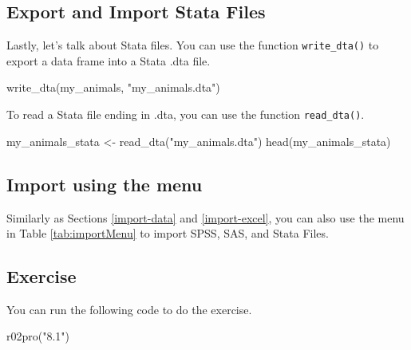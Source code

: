 \documentclass[
]{book}
\newenvironment{Shaded}{\begin{snugshade}}{\end{snugshade}}
\newcommand{\FunctionTok}[1]{\textcolor[rgb]{0.00,0.00,0.00}{#1}}
\newcommand{\NormalTok}[1]{#1}
\newcommand{\OtherTok}[1]{\textcolor[rgb]{0.56,0.35,0.01}{#1}}
\newcommand{\StringTok}[1]{\textcolor[rgb]{0.31,0.60,0.02}{#1}}
\begin{document}
\hypertarget{export-and-import-stata-files}{%
\subsection{Export and Import Stata Files}\label{export-and-import-stata-files}}

Lastly, let's talk about Stata files. You can use the function \texttt{write\_dta()} to export a data frame into a Stata .dta file.

\begin{Shaded}
\begin{Highlighting}[]
\FunctionTok{write\_dta}\NormalTok{(my\_animals, }\StringTok{"my\_animals.dta"}\NormalTok{)}
\end{Highlighting}
\end{Shaded}

To read a Stata file ending in .dta, you can use the function \texttt{read\_dta()}.

\begin{Shaded}
\begin{Highlighting}[]
\NormalTok{my\_animals\_stata }\OtherTok{\textless{}{-}} \FunctionTok{read\_dta}\NormalTok{(}\StringTok{"my\_animals.dta"}\NormalTok{)}
\FunctionTok{head}\NormalTok{(my\_animals\_stata)}
\end{Highlighting}
\end{Shaded}

\hypertarget{import-using-the-menu}{%
\subsection{Import using the menu}\label{import-using-the-menu}}

Similarly as Sections \ref{import-data} and \ref{import-excel}, you can also use the menu in Table \ref{tab:importMenu} to import SPSS, SAS, and Stata Files.

\hypertarget{exercise-11}{%
\subsection{Exercise}\label{exercise-11}}

You can run the following code to do the exercise.

\begin{Shaded}
\begin{Highlighting}[]
\FunctionTok{r02pro}\NormalTok{(}\StringTok{"8.1"}\NormalTok{)}
\end{Highlighting}
\end{Shaded}
\end{document}
